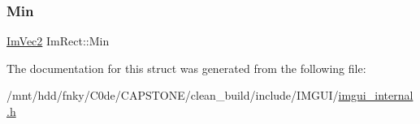 \subsubsection{\texorpdfstring{Min}{Min}}
{\footnotesize\ttfamily \hyperlink{structImVec2}{Im\+Vec2} Im\+Rect\+::\+Min}



The documentation for this struct was generated from the following file\+:\begin{DoxyCompactItemize}
\item 
/mnt/hdd/fnky/\+C0de/\+C\+A\+P\+S\+T\+O\+N\+E/clean\+\_\+build/include/\+I\+M\+G\+U\+I/\hyperlink{imgui__internal_8h}{imgui\+\_\+internal.\+h}\end{DoxyCompactItemize}

